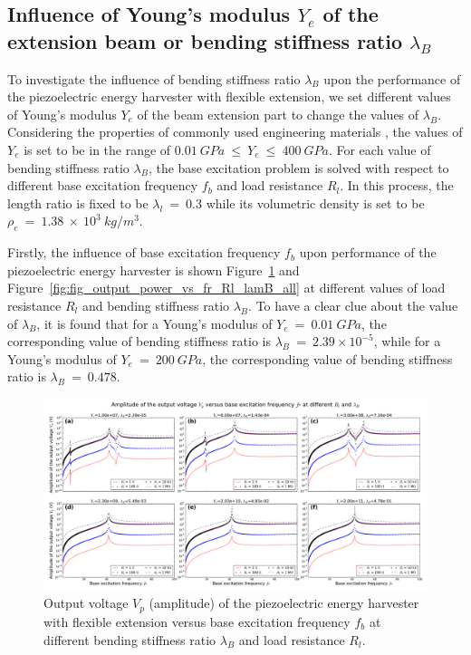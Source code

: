 \documentclass{elsarticle}
\begin{document}
\subsection{Influence of Young's modulus $Y_e$ of the extension beam or bending stiffness ratio $\lambda_B$}

To investigate the influence of bending stiffness ratio $\lambda_B$ upon the performance of the piezoelectric energy harvester with flexible extension, we set different values of Young's modulus $Y_e$ of the beam extension part to change the values of $\lambda_B$. Considering the properties of commonly used engineering materials \cite{warlimont2018springer}, the values of $Y_e$ is set to be in the range of $0.01\ GPa\ \leq\ Y_e\ \leq\ 400\ GPa$. For each value of bending stiffness ratio $\lambda_B$, the base excitation problem is solved with respect to different base excitation frequency $f_b$ and load resistance $R_l$. In this process, the length ratio is fixed to be $\lambda_l\ =\ 0.3$ while its volumetric density is set to be $\rho_e\ =\ 1.38\ \times\ 10^3\ kg/m^3$.

Firstly, the influence of base excitation frequency $f_b$ upon performance of the piezoelectric energy harvester is shown Figure~\ref{fig:fig_output_voltage_vs_fr_Rl_lamB_all} and Figure~\ref{fig:fig_output_power_vs_fr_Rl_lamB_all} at different values of load resistance $R_l$ and bending stiffness ratio $\lambda_B$. To have a clear clue about the value of $\lambda_B$, it is found that for a Young's modulus of $Y_e\ =\ 0.01\ GPa$, the corresponding value of bending stiffness ratio is $\lambda_B\ =\ 2.39\times10^{-5}$, while for a Young's modulus of $Y_e\ =\ 200\ GPa$, the corresponding value of bending stiffness ratio is $\lambda_B\ =\ 0.478$.

\begin{figure}[!htbp]
    \centering
    \includegraphics[width=\textwidth]{./fig_output_voltage_vs_fr_Rl_lamB_all}
    \caption{Output voltage $V_p$ (amplitude) of the piezoelectric energy harvester with flexible extension versus base excitation frequency $f_b$ at different bending stiffness ratio $\lambda_B$ and load resistance $R_l$. \color{red}{to be revised in the legend. change figure title} }
    \label{fig:fig_output_voltage_vs_fr_Rl_lamB_all}
\end{figure}
\end{document}
